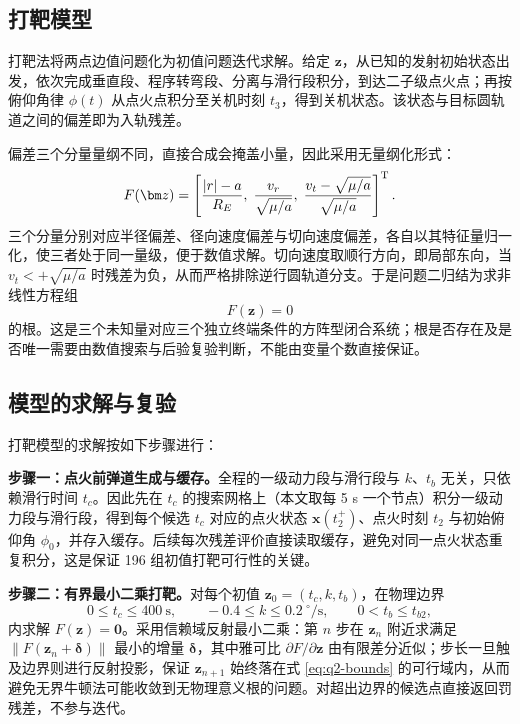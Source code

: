 \documentclass[withoutpreface,bwprint]{cumcmthesis}
\begin{document}
\subsection{打靶模型}
打靶法将两点边值问题化为初值问题迭代求解。给定 $\bm z$，从已知的发射初始状态出发，依次完成垂直段、程序转弯段、分离与滑行段积分，到达二子级点火点；再按俯仰角律 $\phi(t)$ 从点火点积分至关机时刻 $t_3$，得到关机状态。该状态与目标圆轨道之间的偏差即为入轨残差。

偏差三个分量量纲不同，直接合成会掩盖小量，因此采用无量纲化形式：
\begin{equation}
F(\bm z)=\left[\frac{|r|-a}{R_E},\;
\frac{v_r}{\sqrt{\mu/a}},\;
\frac{v_t-\sqrt{\mu/a}}{\sqrt{\mu/a}}\right]^{\rm T}.
\label{eq:resid}
\end{equation}
三个分量分别对应半径偏差、径向速度偏差与切向速度偏差，各自以其特征量归一化，使三者处于同一量级，便于数值求解。切向速度取顺行方向，即局部东向，当 $v_t<+\sqrt{\mu/a}$ 时残差为负，从而严格排除逆行圆轨道分支。于是问题二归结为求非线性方程组
\begin{equation}
F(\bm z)=0
\label{eq:shoot}
\end{equation}
的根。这是三个未知量对应三个独立终端条件的方阵型闭合系统；根是否存在及是否唯一需要由数值搜索与后验复验判断，不能由变量个数直接保证。

\subsection{模型的求解与复验}
打靶模型的求解按如下步骤进行：

\textbf{步骤一：点火前弹道生成与缓存。}全程的一级动力段与滑行段与 $k$、$t_b$ 无关，只依赖滑行时间 $t_c$。因此先在 $t_c$ 的搜索网格上（本文取每 5 s 一个节点）积分一级动力段与滑行段，得到每个候选 $t_c$ 对应的点火状态 $\bm x(t_2^+)$、点火时刻 $t_2$ 与初始俯仰角 $\phi_0$，并存入缓存。后续每次残差评价直接读取缓存，避免对同一点火状态重复积分，这是保证 196 组初值打靶可行性的关键。

\textbf{步骤二：有界最小二乘打靶。}对每个初值 $\bm z_0=(t_c,k,t_b)$，在物理边界
\begin{equation}
0\le t_c\le400\ \mathrm{s},\qquad -0.4\le k\le0.2\ ^\circ/\mathrm{s},\qquad 0<t_b\le t_{b2},
\label{eq:q2-bounds}
\end{equation}
内求解 $F(\bm z)=\bm 0$。采用信赖域反射最小二乘：第 $n$ 步在 $\bm z_n$ 附近求满足 $\|F(\bm z_n+\bm\delta)\|$ 最小的增量 $\bm\delta$，其中雅可比 $\partial F/\partial \bm z$ 由有限差分近似；步长一旦触及边界则进行反射投影，保证 $\bm z_{n+1}$ 始终落在式 \eqref{eq:q2-bounds} 的可行域内，从而避免无界牛顿法可能收敛到无物理意义根的问题。对超出边界的候选点直接返回罚残差，不参与迭代。
\end{document}
